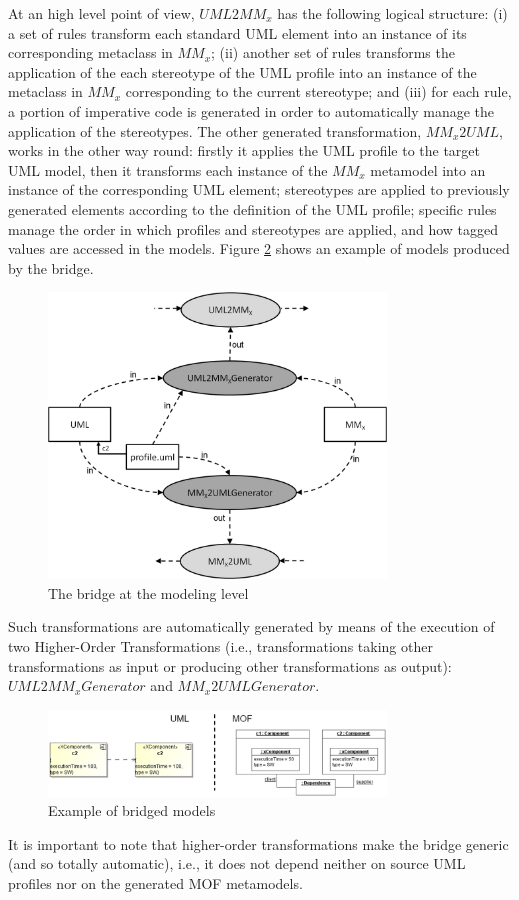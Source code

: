 At an high level point of view, $UML2MM_x$ has the following logical structure: (i) a set of rules transform each standard UML element into an instance of its corresponding metaclass in $MM_x$; (ii) another set of rules transforms the application of the each stereotype of the UML profile into an instance of the metaclass in $MM_x$ corresponding to the current stereotype; and (iii) for each rule, a portion of imperative code is generated in order to automatically manage the application of the stereotypes.
The other generated transformation, $MM_x2UML$, works in the other way round: firstly it applies the UML profile to the target UML model, then it transforms each instance of the $MM_x$ metamodel into an instance of the corresponding UML element; stereotypes are applied to  previously generated elements according to the definition of the UML profile; specific rules manage the order in which profiles and stereotypes are applied, and how tagged values are accessed in the models. Figure \ref{fig:modelingExample} shows an example of models produced by the bridge. 

\begin{figure}[htbp]
	\centering
	\includegraphics[width=0.80\textwidth]{figures/modelingLevel.png}
	\caption{The bridge at the modeling level}
	\label{fig:modelingLevel}
\end{figure}
%
Such transformations are automatically generated by means of the execution of two Higher-Order Transformations
(i.e., transformations taking other transformations as input or producing
other transformations as output): $UML2MM_xGenerator$ and $MM_x2UMLGenerator$.

\begin{figure}[htbp]
	\centering
		\includegraphics[width=0.80\textwidth]{figures/modelingExample.png}
	\caption{Example of bridged models}
	\label{fig:modelingExample}
\end{figure}
%
It is important to note that higher-order transformations make the bridge generic (and so totally automatic), i.e., it does not depend neither on source UML profiles nor on the generated MOF metamodels.


